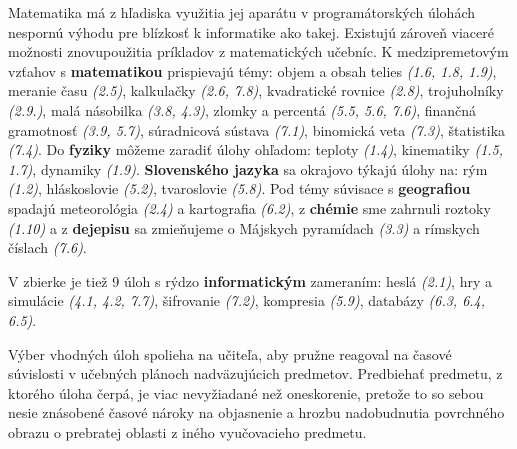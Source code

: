 Matematika má z hľadiska využitia jej aparátu v programátorských úlohách nespornú výhodu pre blízkosť k informatike ako takej. Existujú zároveň viaceré možnosti znovupoužitia príkladov z matematických učebníc. K medzipremetovým vzťahov s \textbf{matematikou} prispievajú témy:
objem a obsah telies \emph{(1.6, 1.8, 1.9)}, meranie času \emph{(2.5)}, kalkulačky \emph{(2.6, 7.8)}, kvadratické rovnice \emph{(2.8)}, trojuholníky \emph{(2.9.)}, malá násobilka \emph{(3.8, 4.3)}, zlomky a percentá \emph{(5.5, 5.6, 7.6)}, finančná gramotnosť \emph{(3.9, 5.7)}, súradnicová sústava \emph{(7.1)}, binomická veta \emph{(7.3)}, štatistika \emph{(7.4)}. Do \textbf{fyziky} môžeme zaradiť úlohy ohľadom: teploty \emph{(1.4)}, kinematiky \emph{(1.5, 1.7)}, dynamiky \emph{(1.9)}. \textbf{Slovenského jazyka} sa okrajovo týkajú úlohy na: rým \emph{(1.2)}, hláskoslovie \emph{(5.2)}, tvaroslovie \emph{(5.8)}. Pod témy súvisace s \textbf{geografiou} spadajú meteorológia \emph{(2.4)} a kartografia \emph{(6.2)}, z \textbf{chémie} sme zahrnuli roztoky \emph{(1.10)} a z \textbf{dejepisu} sa zmieňujeme o Májskych pyramídach \emph{(3.3)} a rímskych číslach \emph{(7.6)}.

V zbierke je tiež 9 úloh s rýdzo \textbf{informatickým} zameraním: heslá \emph{(2.1)}, hry a simulácie \emph{(4.1, 4.2, 7.7)}, šifrovanie \emph{(7.2)}, kompresia \emph{(5.9)}, databázy \emph{(6.3, 6.4, 6.5)}.

Výber vhodných úloh spolieha na učiteľa, aby pružne reagoval na časové súvislosti v učebných plánoch nadväzujúcich predmetov. Predbiehať predmetu, z ktorého úloha čerpá, je viac nevyžiadané než oneskorenie, pretože to so sebou nesie znásobené časové nároky na objasnenie a hrozbu nadobudnutia povrchného obrazu o prebratej oblasti z iného vyučovacieho predmetu.
